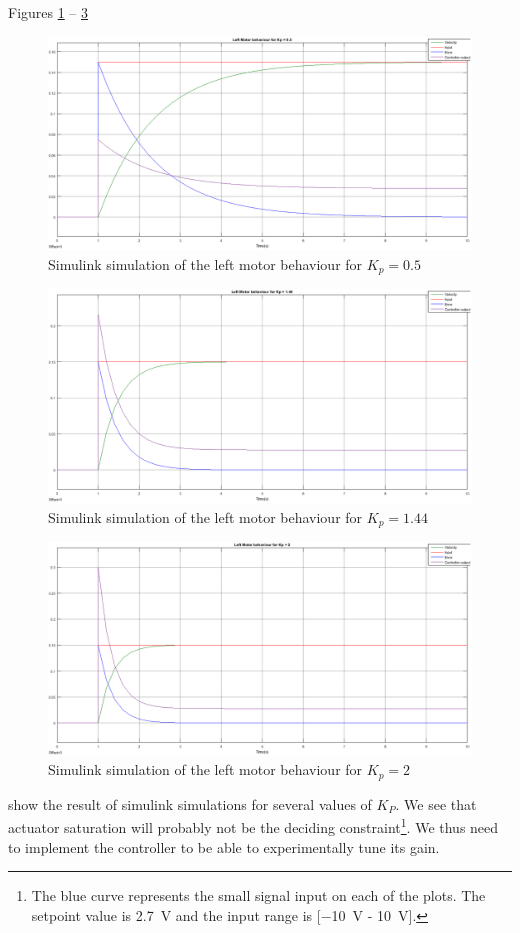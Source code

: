 Figures \ref{fig:LM_SIM_KP050} -- \ref{fig:LM_SIM_KP200}
\begin{figure}[htbp]
\centering
\includegraphics[width = \textwidth]{pics/LM_KP050_Sim.png}
\caption{Simulink simulation of the left motor behaviour for $K_p = 0.5$}
\label{fig:LM_SIM_KP050}
\end{figure}
%
\begin{figure}[htbp]
\centering
\includegraphics[width = \textwidth]{pics/LM_KP144_Sim.png}
\caption{Simulink simulation of the left motor behaviour for $K_p = 1.44$}
\label{fig:LM_SIM_KP144}
\end{figure}
%
\begin{figure}[htbp]
\centering
\includegraphics[width = \textwidth]{pics/LM_KP200_sim.png}
\caption{Simulink simulation of the left motor behaviour for $K_p = 2$}
\label{fig:LM_SIM_KP200}
\end{figure}
show the result of simulink simulations for several values of $K_P$. We see that actuator saturation will probably not be the deciding constraint\footnote{The blue curve represents the small signal input on each of the plots. The setpoint value is \SI{2.7}{V} and the input range is [\SI{-10}{V} - \SI{10}{V}].}. We thus need to implement the controller to be able to experimentally tune its gain.

